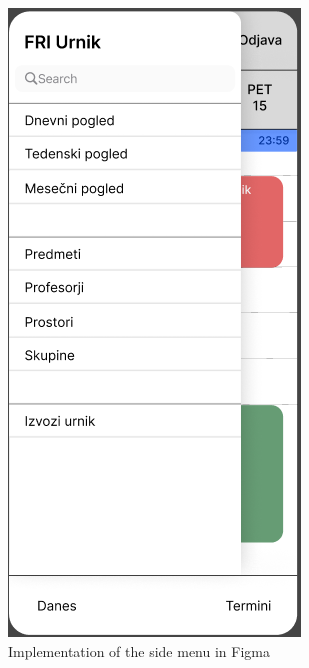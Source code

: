 \documentclass[sigconf,nonacm]{acmart}
\begin{document}
\begin{figure}[h]
  \centering
  \includegraphics[width=\linewidth]{side-menu.png}
  \caption{Implementation of the side menu in Figma}
\end{figure}
\end{document}
